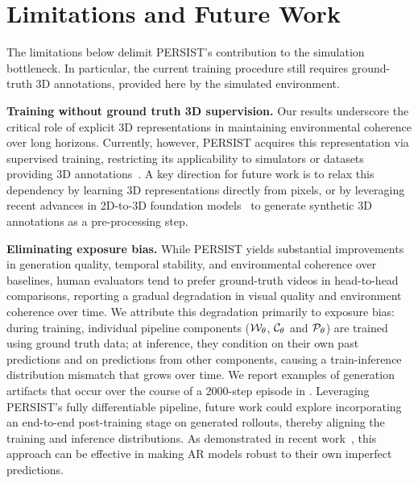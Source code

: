 \vspace{-0.25cm}
\section{Limitations and Future Work}\label{c4:sec:limitations}

The limitations below delimit PERSIST's contribution to the simulation bottleneck. In particular, the current training procedure still requires ground-truth 3D annotations, provided here by the simulated environment.

\textbf{Training without ground truth 3D supervision.} Our results underscore the critical role of explicit 3D representations in maintaining environmental coherence over long horizons. Currently, however, PERSIST acquires this representation via supervised training, restricting its applicability to simulators or datasets providing 3D annotations~\citep[e.g.][]{zhou2018stereo,Matterport3D,yeshwanth2023scannet++}. A key direction for future work is to relax this dependency by learning 3D representations directly from pixels, or by leveraging recent advances in 2D-to-3D foundation models~\citep{wang2025vggt,sam3dteam2025sam3d3dfyimages} to generate synthetic 3D annotations as a pre-processing step.

\textbf{Eliminating exposure bias.} While PERSIST yields substantial improvements in generation quality, temporal stability, and environmental coherence over baselines, human evaluators tend to prefer ground-truth videos in head-to-head comparisons, reporting a gradual degradation in visual quality and environment coherence over time. We attribute this degradation primarily to exposure bias: during training, individual pipeline components (${\mathcal{W}}_\theta$, ${\mathcal{C}}_\theta$ and ${\mathcal{P}}_\theta$) are trained using ground truth data; at inference, they condition on their own past predictions and on predictions from other components, causing a train-inference distribution mismatch that grows over time. We report examples of generation artifacts that occur over the course of a 2000-step episode in . Leveraging PERSIST's fully differentiable pipeline, future work could explore incorporating an end-to-end post-training stage on generated rollouts, thereby aligning the training and inference distributions. As demonstrated in recent work~\citep{huang2025self}, this approach can be effective in making AR models robust to their own imperfect predictions.

